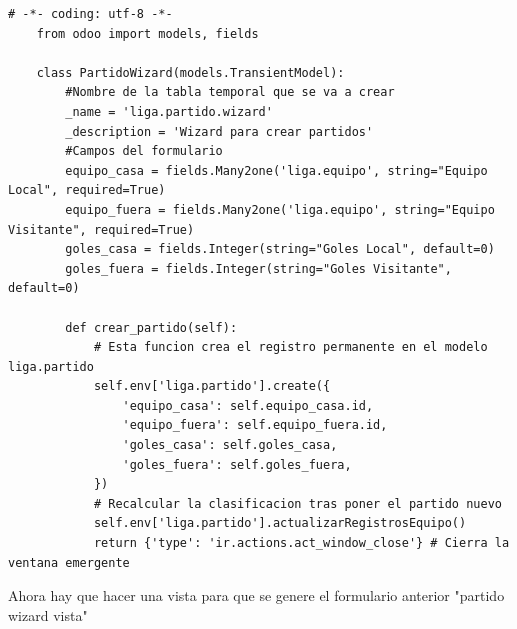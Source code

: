 \documentclass[a4paper,12pt]{article}
\begin{document}
\vspace{0.5cm}
\begin{lstlisting}[style=javascript]
    # -*- coding: utf-8 -*-
    from odoo import models, fields

    class PartidoWizard(models.TransientModel):
        #Nombre de la tabla temporal que se va a crear
        _name = 'liga.partido.wizard'
        _description = 'Wizard para crear partidos'
        #Campos del formulario 
        equipo_casa = fields.Many2one('liga.equipo', string="Equipo Local", required=True)
        equipo_fuera = fields.Many2one('liga.equipo', string="Equipo Visitante", required=True)
        goles_casa = fields.Integer(string="Goles Local", default=0)
        goles_fuera = fields.Integer(string="Goles Visitante", default=0)

        def crear_partido(self):
            # Esta funcion crea el registro permanente en el modelo liga.partido
            self.env['liga.partido'].create({
                'equipo_casa': self.equipo_casa.id,
                'equipo_fuera': self.equipo_fuera.id,
                'goles_casa': self.goles_casa,
                'goles_fuera': self.goles_fuera,
            })
            # Recalcular la clasificacion tras poner el partido nuevo
            self.env['liga.partido'].actualizarRegistrosEquipo()
            return {'type': 'ir.actions.act_window_close'} # Cierra la ventana emergente 
\end{lstlisting}

Ahora hay que hacer una vista para que se genere el formulario anterior "partido wizard vista"
\end{document}
